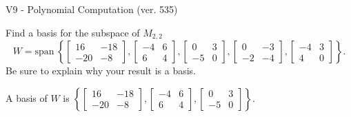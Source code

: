 \begin{exercise}
  \begin{exerciseTitle}V9 - Polynomial Computation (ver. 535)\end{exerciseTitle}
  \begin{exerciseStatement}
    Find a basis for the subspace of \(M_{2,2}\) 
\[W=\mathrm{span}\ \left\{\left[\begin{array}{cc}
16 & -18 \\
-20 & -8
\end{array}\right] , \left[\begin{array}{cc}
-4 & 6 \\
6 & 4
\end{array}\right] , \left[\begin{array}{cc}
0 & 3 \\
-5 & 0
\end{array}\right] , \left[\begin{array}{cc}
0 & -3 \\
-2 & -4
\end{array}\right] , \left[\begin{array}{cc}
-4 & 3 \\
4 & 0
\end{array}\right]\right\}.\]
 Be sure to explain why your result is a basis.


  \end{exerciseStatement}
  \begin{exerciseAnswer}
   A basis of \(W\) is  \(\left\{\left[\begin{array}{cc}
16 & -18 \\
-20 & -8
\end{array}\right] , \left[\begin{array}{cc}
-4 & 6 \\
6 & 4
\end{array}\right] , \left[\begin{array}{cc}
0 & 3 \\
-5 & 0
\end{array}\right]\right\}\).
  


  \end{exerciseAnswer}
\end{exercise}